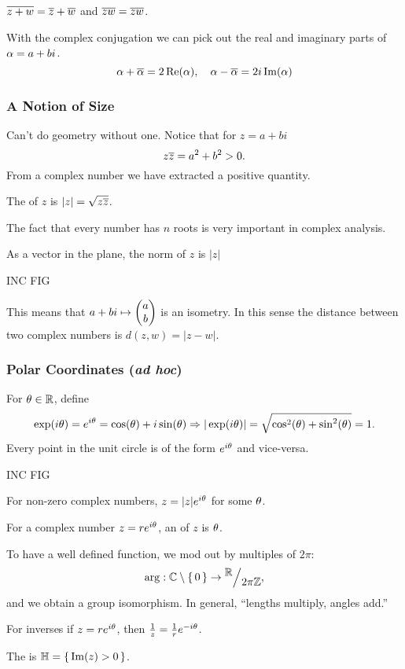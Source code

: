 \documentclass[12pt]{memoir}
\begin{document}
\begin{ptcbp}
$\overline{z+w}=\overline z+\overline w$ and $\overline{zw}=\overline z\overline w$.
\end{ptcbp}

With the complex conjugation we can pick out the real and imaginary parts of $\alpha=a+bi$. 
$$\alpha+\overline{\alpha}=2\Re(\alpha),\quad \alpha-\overline{\alpha}=2i\Im(\alpha)$$
\subsubsection{A Notion of Size}
Can't do geometry without one. Notice that for $z=a+bi$
$$z\overline z=a^2+b^2>0.$$
From a complex number we have extracted a positive quantity.

\begin{Def}
    The  of $z$ is $|z|=\sqrt{z\overline z}$.
\end{Def}

The fact that every number has $n$ roots is very important in complex analysis.\par 
As a vector in the plane, the norm of $z$ is $|z|$
\begin{center}
    INC FIG
\end{center}
This means that $a+bi\mapsto\begin{pmatrix} a \\ b \end{pmatrix}$ is an isometry. In this sense the distance between two complex numbers is $d(z,w)=|z-w|$.

\subsubsection{Polar Coordinates (\emph{ad hoc})}

For $\theta\in\mathbb{R}$, define 
$$\exp(i\theta)=e^{i\theta}=\cos(\theta)+i\sin(\theta)\Rightarrow |\exp(i\theta)|=\sqrt{\cos^2(\theta)+\sin^2(\theta)}=1.$$
Every point in the unit circle is of the form $e^{i\theta}$ and vice-versa.
\begin{center}
    INC FIG
\end{center}
For non-zero complex numbers, $z=|z|e^{i\theta}$ for some $\theta$.

\begin{Def}
    For a complex number $z=re^{i\theta}$, an  of $z$ is $\theta$. 
\end{Def}
To have a well defined function, we mod out by multiples of $2\pi$: $$\arg:\bC\less\set{0}\to\quot{\bR}{2\pi\bZ},$$
and we obtain a group isomorphism. In general, ``lengths multiply, angles add.''\par 
For inverses if $z=re^{i\theta}$, then $\frac{1}{z}=\frac1re^{-i\theta}$.

\begin{Def}
    The  is $\mathbb{H}=\{\,\Im(z)>0\,\}$.
\end{Def}
\end{document}
